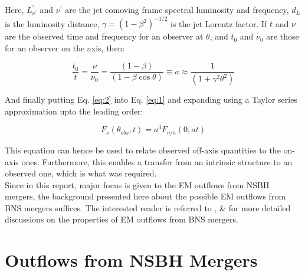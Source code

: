     Here, $L^{\prime}_{\nu^{\prime}}$ and $\nu^{\prime}$ are the jet comoving frame
    spectral luminosity and frequency, $d_L$ is the luminosity distance, $\gamma = (1 -
    \beta^2)^{-1/2}$ is the jet Lorentz factor. If $t$ and $\nu$ are the observed time
    and frequency  for an observer at $\theta$, and $t_0$ and $\nu_0$ are those for an
    observer on the axis, then:

    \begin{equation}
        \label{eq:2}
        \dfrac{t_0}{t} =
            \dfrac{\nu}{\nu_0}
                       =
            \dfrac{(1 - \beta)}{(1 - \beta \cos \theta)}
            \equiv a
            \approx \dfrac{1}{(1 + \gamma^2 \theta^2)}
    \end{equation}

    And finally putting Eq. \ref{eq:2} into Eq. \ref{eq:1} and expanding using a Taylor
    series approximation upto the leading order:

    \begin{equation}
        \label{eq:3}
        F_{\nu}(\theta_{obs}, t) = a^3 F_{\nu/a}(0, at)
    \end{equation}

    This equation can hence be used to relate observed off-axis quantities to the
    on-axis ones. Furthermore, this enables a transfer from an intrinsic structure to an
    observed one, which is what was required.\\
    Since in this report, major focus is given to the EM outflows from NSBH mergers, the
    background presented here about the possible EM outflows from BNS mergers suffices.
    The interested reader is referred to \cite{ioka_2019}, \cite{mohan_2019} \&
    \cite{lee_2007} for more detailed discussions on the properties of EM outflows from
    BNS mergers.

\section{Outflows from NSBH Mergers}\label{sec:nsbh}

